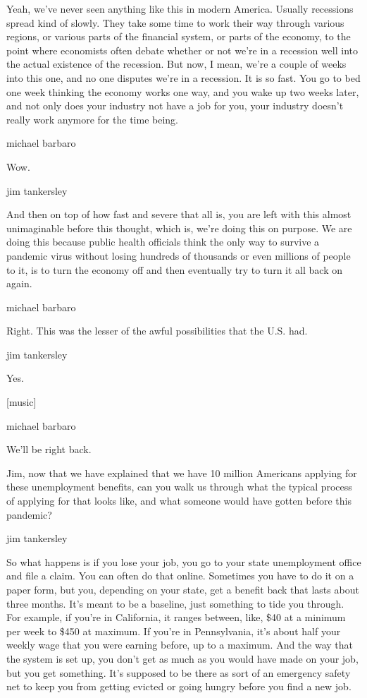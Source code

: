 Yeah, we've never seen anything like this in modern America. Usually
recessions spread kind of slowly. They take some time to work their way
through various regions, or various parts of the financial system, or
parts of the economy, to the point where economists often debate whether
or not we're in a recession well into the actual existence of the
recession. But now, I mean, we're a couple of weeks into this one, and
no one disputes we're in a recession. It is so fast. You go to bed one
week thinking the economy works one way, and you wake up two weeks
later, and not only does your industry not have a job for you, your
industry doesn't really work anymore for the time being.

michael barbaro

Wow.

jim tankersley

And then on top of how fast and severe that all is, you are left with
this almost unimaginable before this thought, which is, we're doing this
on purpose. We are doing this because public health officials think the
only way to survive a pandemic virus without losing hundreds of
thousands or even millions of people to it, is to turn the economy off
and then eventually try to turn it all back on again.

michael barbaro

Right. This was the lesser of the awful possibilities that the U.S. had.

jim tankersley

Yes.

{[}music{]}

michael barbaro

We'll be right back.

Jim, now that we have explained that we have 10 million Americans
applying for these unemployment benefits, can you walk us through what
the typical process of applying for that looks like, and what someone
would have gotten before this pandemic?

jim tankersley

So what happens is if you lose your job, you go to your state
unemployment office and file a claim. You can often do that online.
Sometimes you have to do it on a paper form, but you, depending on your
state, get a benefit back that lasts about three months. It's meant to
be a baseline, just something to tide you through. For example, if
you're in California, it ranges between, like, \$40 at a minimum per
week to \$450 at maximum. If you're in Pennsylvania, it's about half
your weekly wage that you were earning before, up to a maximum. And the
way that the system is set up, you don't get as much as you would have
made on your job, but you get something. It's supposed to be there as
sort of an emergency safety net to keep you from getting evicted or
going hungry before you find a new job.

